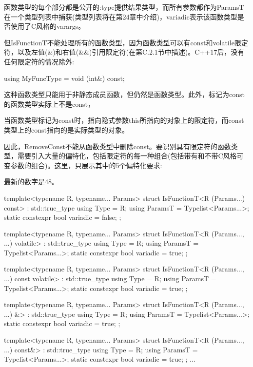 函数类型的每个部分都是公开的:type提供结果类型，而所有参数都作为ParamsT在一个类型列表中捕获(类型列表将在第24章中介绍)，variadic表示该函数类型是否使用了C风格的varargs。

但IsFunctionT不能处理所有的函数类型，因为函数类型可以有const和volatile限定符，以及左值(\&)和右值(\&\&)引用限定符(在第C.2.1节中描述)。C++17后，没有任何限定符的情况除外:

\begin{cpp}
using MyFuncType = void (int&) const;
\end{cpp}

这种函数类型只能用于非静态成员函数，但仍然是函数类型。此外，标记为const的函数类型实际上不是const，

\begin{notice}
当函数类型标记为const时，指向隐式参数this所指向的对象上的限定符，而const类型上的const指向的是实际类型的对象。
\end{notice}

因此，RemoveConst不能从函数类型中删除const。要识别具有限定符的函数类型，需要引入大量的偏特化，包括限定符的每一种组合(包括带有和不带C风格可变参数的组合)。这里，只展示其中的5个偏特化要求:

\begin{notice}
最新的数字是48。
\end{notice}

\begin{cpp}
template<typename R, typename... Params>
struct IsFunctionT<R (Params...) const> : std::true_type {
	using Type = R;
	using ParamsT = Typelist<Params...>;
	static constexpr bool variadic = false;
};

template<typename R, typename... Params>
struct IsFunctionT<R (Params..., ...) volatile> : std::true_type {
	using Type = R;
	using ParamsT = Typelist<Params...>;
	static constexpr bool variadic = true;
};

template<typename R, typename... Params>
struct IsFunctionT<R (Params..., ...) const volatile> : std::true_type {
	using Type = R;
	using ParamsT = Typelist<Params...>;
	static constexpr bool variadic = true;
};

template<typename R, typename... Params>
struct IsFunctionT<R (Params..., ...) &> : std::true_type {
	using Type = R;
	using ParamsT = Typelist<Params...>;
	static constexpr bool variadic = true;
};

template<typename R, typename... Params>
struct IsFunctionT<R (Params..., ...) const&> : std::true_type {
	using Type = R;
	using ParamsT = Typelist<Params...>;
	static constexpr bool variadic = true;
};
...
\end{cpp}

